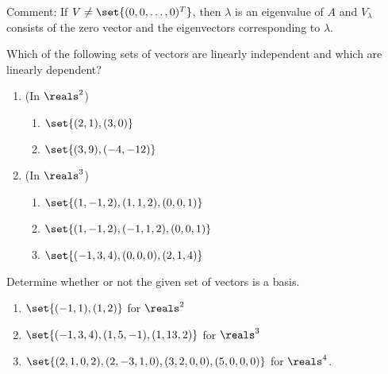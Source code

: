 \documentclass[english,12pt,a4paper]{scrartcl}
\newenvironment{modenumerate}
  {\enumerate\setupmodenumerate}
  {\endenumerate}
\newif\ifmoditem
\newcommand{\setupmodenumerate}{%
  \global\moditemfalse
  \let\origmakelabel\makelabel
  \def\moditem##1{\global\moditemtrue\def\mesymbol{##1}\item}%
  \def\makelabel##1{%
  \origmakelabel{##1\ifmoditem\rlap{\mesymbol}\fi\enspace}%
\global\moditemfalse}%
}
\begin{document}
\begin{modenumerate}
  \begin{mdframed}
    Comment: If $V \ne \set{
        (0 , 0 , \dots , 0)^T
    }$, then $\lambda$ is an eigenvalue of $A$ and $V_\lambda$ consists of the 
    zero vector and the eigenvectors corresponding to $\lambda$.
  \end{mdframed}
  \item Which of the following sets of vectors are linearly independent and 
    which are linearly dependent?
    \begin{enumerate}
      \item (In $\reals^2$)
        \begin{multicols}{2}
          \begin{enumerate}
            \item $\set{(2, 1), (3, 0)}$
            \item $\set{(3, 9), (-4, -12)}$
          \end{enumerate}
        \end{multicols}
      \item (In $\reals^3$)
        \begin{multicols}{2}
          \begin{enumerate}
            \item $\set{(1, -1, 2), (1, 1, 2), (0, 0, 1)}$
            \item $\set{(1, -1, 2), (-1, 1, 2), (0, 0, 1)}$
            \item $\set{(-1, 3, 4), (0, 0, 0), (2, 1, 4)}$
          \end{enumerate}
        \end{multicols}
    \end{enumerate}
  \moditem{*} Determine whether or not the given set of vectors is a basis.
  \begin{enumerate}
    \item $\set{(-1, 1), (1, 2)}$ for $\reals^2$
    \item $\set{(-1, 3, 4), (1, 5, -1), (1, 13, 2)}$ for $\reals^3$
    \item $\set{(2, 1, 0, 2), (2, -3, 1, 0), (3, 2, 0, 0), (5, 0, 0, 0)}$ for 
      $\reals^4$.
  \end{enumerate}
\end{modenumerate}
\end{document}
